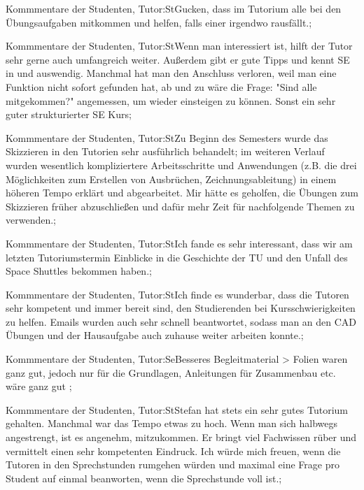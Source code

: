 \documentclass[10pt]{beamer}
\begin{document}
\begin{frame}[fragile]{Kommmentare der Studenten, Tutor:St}Gucken, dass im Tutorium alle bei den Übungsaufgaben mitkommen und helfen, falls einer irgendwo rausfällt.;
 \end{frame}
\begin{frame}[fragile]{Kommmentare der Studenten, Tutor:St}Wenn man interessiert ist, hilft der Tutor sehr gerne auch umfangreich weiter. Außerdem gibt er gute Tipps und kennt SE in und auswendig. Manchmal hat man den Anschluss verloren, weil man eine Funktion nicht sofort gefunden hat, ab und zu wäre die Frage: "Sind alle mitgekommen?" angemessen, um wieder einsteigen zu können.
 Sonst ein sehr guter strukturierter SE Kurs;
 \end{frame}
\begin{frame}[fragile]{Kommmentare der Studenten, Tutor:St}Zu Beginn des Semesters wurde das Skizzieren in den Tutorien sehr ausführlich behandelt; im weiteren Verlauf wurden wesentlich kompliziertere Arbeitsschritte und Anwendungen (z.B. die drei Möglichkeiten zum Erstellen von Ausbrüchen, Zeichnungsableitung) in einem höheren Tempo erklärt und abgearbeitet. Mir hätte es geholfen, die Übungen zum Skizzieren früher abzuschließen und dafür mehr Zeit für nachfolgende Themen zu verwenden.;
 \end{frame}
\begin{frame}[fragile]{Kommmentare der Studenten, Tutor:St}Ich fande es sehr interessant, dass wir am letzten Tutoriumstermin Einblicke in die Geschichte der TU und den Unfall des Space Shuttles bekommen haben.;
 \end{frame}
\begin{frame}[fragile]{Kommmentare der Studenten, Tutor:St}Ich finde es wunderbar, dass die Tutoren sehr kompetent und immer bereit sind, den Studierenden bei Kursschwierigkeiten zu helfen. Emails wurden auch sehr schnell beantwortet, sodass man an den CAD Übungen und der Hausaufgabe auch zuhause weiter arbeiten konnte.;
 \end{frame}
\begin{frame}[fragile]{Kommmentare der Studenten, Tutor:Se}Besseres Begleitmaterial   > Folien waren ganz gut, jedoch nur für die Grundlagen, Anleitungen für Zusammenbau etc. wäre ganz gut ;
 \end{frame}
\begin{frame}[fragile]{Kommmentare der Studenten, Tutor:St}Stefan hat stets ein sehr gutes Tutorium gehalten. Manchmal war das Tempo etwas zu hoch. Wenn man sich halbwegs angestrengt, ist es angenehm, mitzukommen. Er bringt viel Fachwissen rüber und vermittelt einen sehr kompetenten Eindruck. Ich würde mich freuen, wenn die Tutoren in den Sprechstunden rumgehen würden und maximal eine Frage pro Student auf einmal beanworten, wenn die Sprechstunde voll ist.;
 \end{frame}
\end{document}
